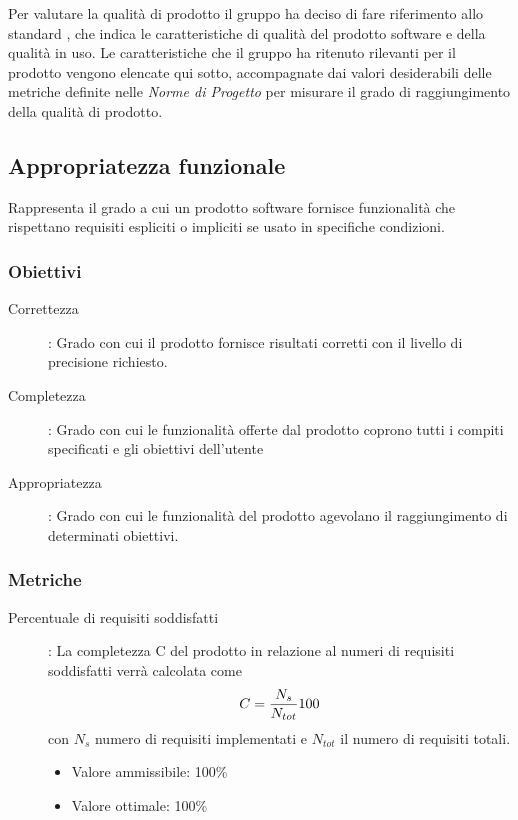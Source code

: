 \documentclass[../piano-di-qualifica.tex]{subfiles}
\begin{document}
Per valutare la qualità di prodotto il gruppo ha deciso di fare riferimento allo standard , che indica le caratteristiche di qualità del prodotto software e della qualità in uso. Le caratteristiche che il gruppo ha ritenuto rilevanti per il prodotto vengono elencate qui sotto, accompagnate dai valori desiderabili delle metriche definite nelle \textit{Norme di Progetto} per misurare il grado di raggiungimento della qualità di prodotto.

\subsection{Appropriatezza funzionale}%
\label{sub:appropriatezza_funzionale}
  Rappresenta il grado a cui un prodotto software fornisce funzionalità che rispettano requisiti espliciti o impliciti se usato in specifiche condizioni.
  \subsubsection{Obiettivi}%
  \label{subs:obiettivi}
      \begin{description}
        \item [Correttezza]: Grado con cui il prodotto fornisce risultati corretti con il livello di precisione richiesto.
        \item [Completezza]: Grado con cui le funzionalità offerte dal prodotto coprono tutti i compiti specificati e gli obiettivi dell'utente
        \item [Appropriatezza]: Grado con cui le funzionalità del prodotto agevolano il raggiungimento di determinati obiettivi.
      \end{description}

  \subsubsection{Metriche}%
  \label{subs:metriche}
      \begin{description}
    \item [Percentuale di requisiti soddisfatti]: La completezza C del prodotto in relazione al numeri di requisiti soddisfatti verrà calcolata come \begin{equation} C = \frac{N_s}{N_{tot}}\\*100 \end{equation} con \(N_s\) numero di requisiti implementati e \(N_{tot}\) il numero di requisiti totali.
    \begin{itemize} \item Valore ammissibile: 100\% \item Valore ottimale: 100\% \end{itemize}
      \end{description}
\end{document}
